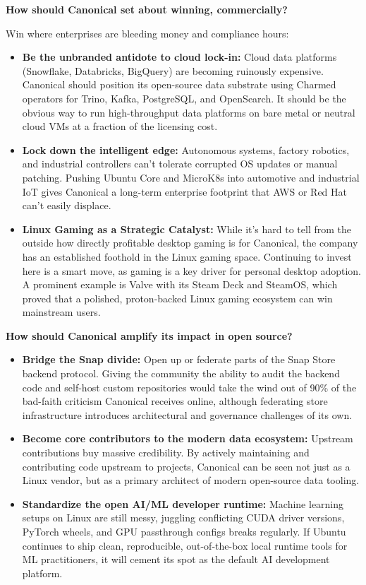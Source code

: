 \documentclass[letterpaper,11pt]{article}
\newcommand{\interviewQuestion}[1]{%
  \vspace{8pt}%
  \textbf{\color{airforceblue}#1}\par%
}
\begin{document}
\interviewQuestion{How should Canonical set about winning, commercially?}

Win where enterprises are bleeding money and compliance hours:

\begin{itemize}[leftmargin=0.2in, itemsep=3pt]
    \item \textbf{Be the unbranded antidote to cloud lock-in:} Cloud data platforms (Snowflake, Databricks, BigQuery) are becoming ruinously expensive. Canonical should position its open-source data substrate using Charmed operators for Trino, Kafka, PostgreSQL, and OpenSearch. It should be the obvious way to run high-throughput data platforms on bare metal or neutral cloud VMs at a fraction of the licensing cost.
    \item \textbf{Lock down the intelligent edge:} Autonomous systems, factory robotics, and industrial controllers can't tolerate corrupted OS updates or manual patching. Pushing Ubuntu Core and MicroK8s into automotive and industrial IoT gives Canonical a long-term enterprise footprint that AWS or Red Hat can't easily displace.
    \item \textbf{Linux Gaming as a Strategic Catalyst:} While it's hard to tell from the outside how directly profitable desktop gaming is for Canonical, the company has an established foothold in the Linux gaming space. Continuing to invest here is a smart move, as gaming is a key driver for personal desktop adoption. A prominent example is Valve with its Steam Deck and SteamOS, which proved that a polished, proton-backed Linux gaming ecosystem can win mainstream users.
\end{itemize}

\interviewQuestion{How should Canonical amplify its impact in open source?}

\begin{itemize}[leftmargin=0.2in, itemsep=3pt]
    \item \textbf{Bridge the Snap divide:} Open up or federate parts of the Snap Store backend protocol. Giving the community the ability to audit the backend code and self-host custom repositories would take the wind out of 90\% of the bad-faith criticism Canonical receives online, although federating store infrastructure introduces architectural and governance challenges of its own.
    \item \textbf{Become core contributors to the modern data ecosystem:} Upstream contributions buy massive credibility. By actively maintaining and contributing code upstream to projects, Canonical can be seen not just as a Linux vendor, but as a primary architect of modern open-source data tooling.
    \item \textbf{Standardize the open AI/ML developer runtime:} Machine learning setups on Linux are still messy, juggling conflicting CUDA driver versions, PyTorch wheels, and GPU passthrough configs breaks regularly. If Ubuntu continues to ship clean, reproducible, out-of-the-box local runtime tools for ML practitioners, it will cement its spot as the default AI development platform.
\end{itemize}
\end{document}
